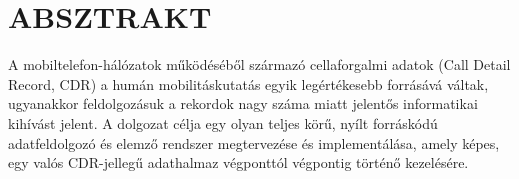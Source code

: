 
\usepackage{tikz}
\usetikzlibrary{shapes.geometric, arrows.meta, positioning, shadows}



\usepackage[acronym,automake]{glossaries-extra}
\makeglossaries


\usepackage[utf8]{inputenc}




 


 








\section*{ABSZTRAKT}

A mobiltelefon-hálózatok működéséből származó cellaforgalmi adatok (Call Detail Record, CDR) a humán mobilitáskutatás egyik legértékesebb forrásává váltak, ugyanakkor feldolgozásuk a rekordok nagy száma miatt jelentős informatikai kihívást jelent. A dolgozat célja egy olyan teljes körű, nyílt forráskódú adatfeldolgozó és elemző rendszer megtervezése és implementálása, amely képes, egy valós CDR-jellegű adathalmaz végponttól végpontig történő kezelésére.

